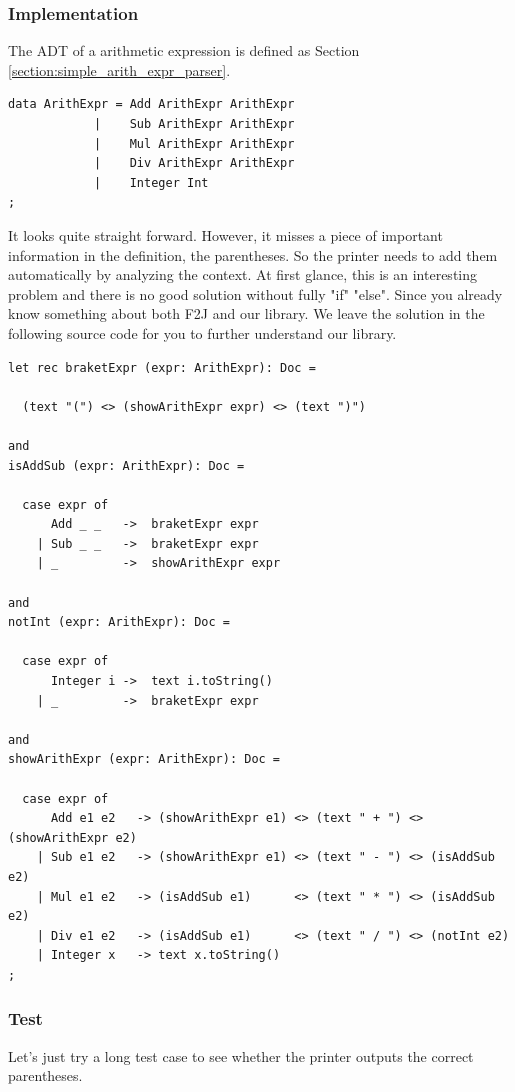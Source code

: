 \subsubsection{Implementation}
The ADT of a arithmetic expression is defined as Section \ref{section:simple_arith_expr_parser}.
\begin{lstlisting}
data ArithExpr = Add ArithExpr ArithExpr
            |    Sub ArithExpr ArithExpr
            |    Mul ArithExpr ArithExpr
            |    Div ArithExpr ArithExpr
            |    Integer Int
;
\end{lstlisting}

It looks quite straight forward. However, it misses a piece of important information in the definition, the parentheses. So the printer needs to add them automatically by analyzing the context. At first glance, this is an interesting problem and there is no good solution without fully "if" "else". Since you already know something about both F2J and our library. We leave the solution in the following source code for you to further understand our library.

\begin{lstlisting}
let rec braketExpr (expr: ArithExpr): Doc =

  (text "(") <> (showArithExpr expr) <> (text ")")

and
isAddSub (expr: ArithExpr): Doc =

  case expr of
      Add _ _   ->  braketExpr expr
    | Sub _ _   ->  braketExpr expr
    | _         ->  showArithExpr expr

and
notInt (expr: ArithExpr): Doc =

  case expr of
      Integer i ->  text i.toString()
    | _         ->  braketExpr expr

and
showArithExpr (expr: ArithExpr): Doc =

  case expr of
      Add e1 e2   -> (showArithExpr e1) <> (text " + ") <> (showArithExpr e2)
    | Sub e1 e2   -> (showArithExpr e1) <> (text " - ") <> (isAddSub e2)
    | Mul e1 e2   -> (isAddSub e1)      <> (text " * ") <> (isAddSub e2)
    | Div e1 e2   -> (isAddSub e1)      <> (text " / ") <> (notInt e2)
    | Integer x   -> text x.toString()
;
\end{lstlisting}

\subsubsection{Test}
Let's just try a long test case to see whether the printer outputs the correct parentheses.

